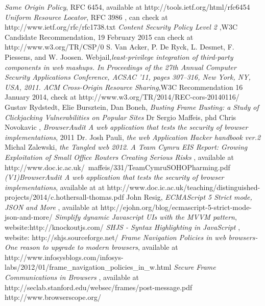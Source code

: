 \documentclass[a4paper,12pt]{report}
\begin{document}
\begin{thebibliography}{1}
  \emph {Same Origin Policy}, RFC 6454, available at  http://tools.ietf.org/html/rfc6454
  \emph{Uniform Resource Locator}, RFC 3986 , can check at http://www.ietf.org/rfc/rfc1738.txt
  \emph{Content Security Policy Level 2} ,W3C Candidate Recommendation, 19 February 2015 can check at http://www.w3.org/TR/CSP/0
  S. Van Acker, P. De Ryck, L. Desmet, F. Piessens, and W. Joosen. Webjail,\emph {least-privilege integration of third-party components in web mashups. In Proceedings of the 27th Annual Computer Security
Applications Conference, ACSAC ’11, pages 307–316, New York, NY, USA, 2011. ACM}
 \emph{Cross-Origin Resource Sharing},W3C Recommendation 16 January 2014, check at http://www.w3.org/TR/2014/REC-cors-20140116/
  Gustav Rydstedt, Elie Bursztein, Dan Boneh, \emph{Busting Frame Busting: a Study of Clickjacking Vulnerabilities on Popular Sites} 
  Dr Sergio Maffeis, phd Chris Novokavic , \emph{BrowserAudit A web application that tests the security of browser implementations}, 2011
  Dr. Josh Pauli, \emph{the web Application Hacker handbook ver.2}
  Michal Zalewski, \emph{the Tangled web 2012}.
  \emph{ A Team Cymru EIS Report: Growing Exploitation of Small Office Routers Creating Serious Risks} , available at http://www.doc.ic.ac.uk/~maffeis/331/TeamCymruSOHOPharming.pdf
  \emph {(V1)BrowserAudit A web application that tests the security of browser implementations}, available at at http://www.doc.ic.ac.uk/teaching/distinguished-projects/2014/c.hothersall-thomas.pdf
  John Resig, \emph {ECMAScript 5 Strict mode, JSON and More} , available at http://ejohn.org/blog/ecmascript-5-strict-mode-json-and-more/
  \emph{Simplify dynamic Javascript UIs with the MVVM pattern}, website:http://knockoutjs.com/
  \emph{SHJS - Syntax Highlighting in JavaScript} , website: http://shjs.sourceforge.net/
  \emph{Frame Navigation Policies in web browsers-One reason to upgrade to modern browsers}, available at http://www.infosysblogs.com/infosys-labs/2012/01/frame\_navigation\_policies\_in\_w.html
  \emph{Secure Frame Communications in Browsers} , available at http://seclab.stanford.edu/websec/frames/post-message.pdf
  http://www.browserscope.org/ 
 \end{thebibliography}
\end{document}
